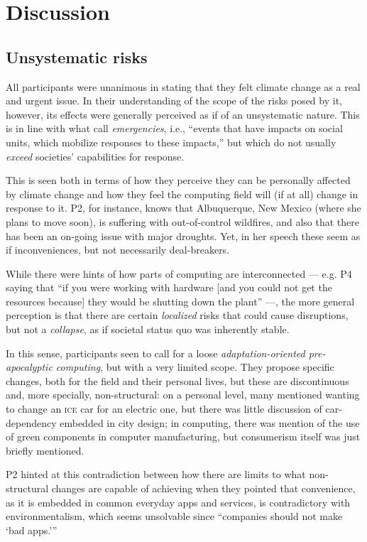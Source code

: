 \section{Discussion}

\subsection{Unsystematic risks}

All participants were unanimous in stating that they felt climate change as a real and urgent issue. In their understanding of the scope of the risks posed by it, however, its effects were generally perceived as if of an unsystematic nature. This is in line with what \citeauthor{silberman2010precarious} call \emph{emergencies}, i.e., ``events that have impacts on social units, which mobilize responses to these impacts,'' but which do not usually \emph{exceed} societies' capabilities for response.

This is seen both in terms of how they perceive they can be personally affected by climate change and how they feel the computing field will (if at all) change in response to it. P2, for instance, knows that Albuquerque, New Mexico (where she plans to move soon), is suffering with out-of-control wildfires, and also that there has been an on-going issue with major droughts. Yet, in her speech these seem as if inconveniences, but not necessarily deal-breakers.

While there were hints of how parts of computing are interconnected --- e.g. P4 saying that ``if you were working with hardware [and you could not get the resources because] they would be shutting down the plant'' ---, the more general perception is that there are certain \emph{localized} risks that could cause disruptions, but not a \emph{collapse}, as if societal status quo was inherently stable.

In this sense, participants seen to call for a loose \emph{adaptation-oriented pre-apocalyptic computing}, but with a very limited scope. They propose specific changes, both for the field and their personal lives, but these are discontinuous and, more specially, non-structural: on a personal level, many mentioned wanting to change an \textsc{ice} car for an electric one, but there was little discussion of car-dependency embedded in city design; in computing, there was mention of the use of green components in computer manufacturing, but consumerism itself was just briefly mentioned.

P2 hinted at this contradiction between how there are limits to what non-structural changes are capable of achieving when they pointed that convenience, as it is embedded in common everyday apps and services, is contradictory with environmentalism, which seems unsolvable since ``companies should not make `bad apps.'\thinspace''

